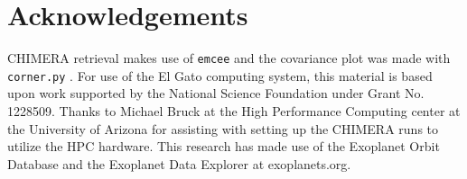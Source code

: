 \documentclass[iop]{emulateapj}
\begin{document}
\vspace{0.1in}
\section*{Acknowledgements}

CHIMERA retrieval makes use of \texttt{emcee} \citep{foreman-mackey2013emcee} and the covariance plot was made with \texttt{corner.py} \citep{foremanCorner}.
For use of the El Gato computing system, this material is based upon work supported by the National Science Foundation under Grant No. 1228509.
Thanks to Michael Bruck at the High Performance Computing center at the University of Arizona for assisting with setting up the CHIMERA runs to utilize the HPC hardware.
This research has made use of the Exoplanet Orbit Database and the Exoplanet Data Explorer at exoplanets.org.





\end{document}
